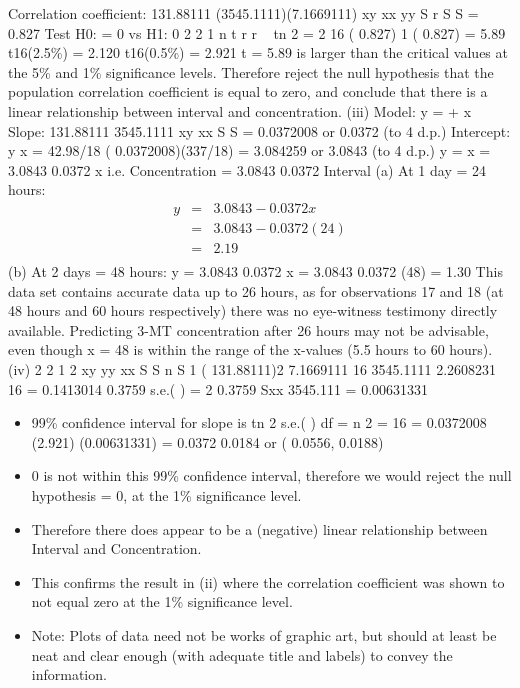 \documentclass[a4paper,12pt]{article}
\begin{document}
Correlation coefficient:
131.88111
(3545.1111)(7.1669111)
xy
xx yy
S
r
S S
= 0.827
Test H0: = 0 vs H1: 0
2
2
1
n
t r
r
~ tn 2
= 2
16
( 0.827)
1 ( 0.827)
= 5.89
t16(2.5\%) = 2.120
t16(0.5\%) = 2.921
t = 5.89 is larger than the critical values at the 5\% and 1\% significance levels. Therefore reject the null hypothesis that the population correlation coefficient is equal to zero, and conclude that there is a linear relationship
between interval and concentration.
(iii) Model: y = + x
Slope:
131.88111
3545.1111
xy
xx
S
S
= 0.0372008 or 0.0372 (to 4 d.p.)
Intercept:
y x
= 42.98/18 ( 0.0372008)(337/18)
= 3.084259 or 3.0843 (to 4 d.p.)
y = x
= 3.0843 0.0372 x
i.e. Concentration = 3.0843 0.0372 Interval
(a) At 1 day = 24 hours:
\begin{eqnarray*}
y &=& 3.0843 -  0.0372 x\\
&=& 3.0843 - 0.0372 (24)\\
&=& 2.19\\
\end{eqnarray*}
(b) At 2 days = 48 hours:
y = 3.0843 0.0372 x
= 3.0843 0.0372 (48)
= 1.30
This data set contains accurate data up to 26 hours, as for observations 17 and 18 (at 48 hours and 60 hours respectively) there was no eye-witness testimony directly available. Predicting 3-MT concentration after 26 hours may not be
advisable, even though x = 48 is within the range of the x-values (5.5 hours to 60 hours).
(iv)
2
2 1
2
xy
yy
xx
S
S
n S
1 ( 131.88111)2
7.1669111
16 3545.1111
2.2608231
16
= 0.1413014
0.3759
s.e.( ) =
2 0.3759
Sxx 3545.111
= 0.00631331
\begin{itemize}
\item 99\% confidence interval for slope is tn 2 s.e.( ) df = n 2 = 16
= 0.0372008 (2.921) (0.00631331)
= 0.0372 0.0184
or ( 0.0556, 0.0188)
\item  0 is not within this 99\% confidence interval, therefore we would reject the
null hypothesis = 0, at the 1\% significance level.
\item Therefore there does appear to be a (negative) linear relationship between
Interval and Concentration.
\item This confirms the result in (ii) where the correlation coefficient was shown to
not equal zero at the 1\% significance level.
\item Note: Plots of data need not be works of graphic art, but should at least be neat and clear
enough (with adequate title and labels) to convey the information.
\end{itemize}
\end{document}
